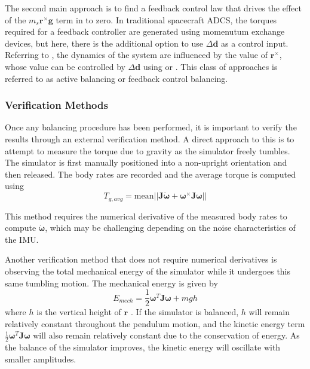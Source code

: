 The second main approach is to find a feedback control law that drives the effect of the $m_s\bm{r}^{\times}\bm{g}$ term in  to zero. In traditional spacecraft ADCS, the torques required for a feedback controller are generated using momenutum exchange devices, but here, there is the additional option to use $\Delta\bm{d}$ as a control input. Referring to , the dynamics of the system are influenced by the value of $\bm{r}^{\times}$, whose value can be controlled by $\Delta\bm{d}$ using  or . This class of approaches is referred to as active balancing or feedback control balancing.

\subsubsection{Verification Methods}

Once any balancing procedure has been performed, it is important to verify the results through an external verification method. A direct approach to this is to attempt to measure the torque due to gravity as the simulator freely tumbles. The simulator is first manually positioned into a non-upright orientation and then released. The body rates are recorded and the average torque is computed using
\begin{equation}
    T_{g,avg} = \text{mean}||\bm{J}\dot{\bm{\omega}} + \bm{\omega}^{\times}\bm{J}\bm{\omega}||
\end{equation}

This method requires the numerical derivative of the measured body rates to compute $\dot{\bm{\omega}}$, which may be challenging depending on the noise characteristics of the IMU.

Another verification method that does not require numerical derivatives is observing the total mechanical energy of the simulator while it undergoes this same tumbling motion. The mechanical energy is given by
\begin{equation}
    E_{mech} = \frac{1}{2}\bm{\omega}^T\bm{J}\bm{\omega} + mgh
\end{equation}
where $h$ is the vertical height of $\bm{r}$ \cite{silva_filtering_2018}. If the simulator is balanced, $h$ will remain relatively constant throughout the pendulum motion, and the kinetic energy term $\frac{1}{2}\bm{\omega}^T\bm{J}\bm{\omega}$ will also remain relatively constant due to the conservation of energy. As the balance of the simulator improves, the kinetic energy will oscillate with smaller amplitudes.

